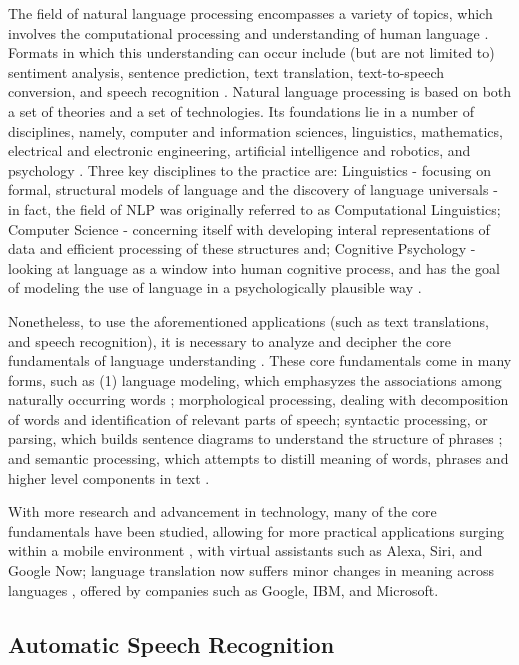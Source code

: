 The field of natural language processing encompasses a variety of topics, which involves the computational processing and understanding of human language \cite{otter2020survey}. Formats in which this understanding can occur include (but are not limited to) sentiment analysis, sentence prediction, text translation, text-to-speech conversion, and speech recognition \cite{chowdhury2003natural}. Natural language processing is based on both a set of theories and a set of technologies. Its foundations lie in a number of disciplines, namely, computer and information sciences, linguistics, mathematics, electrical and electronic engineering, artificial intelligence and robotics, and psychology \cite{chowdhury2003natural}. Three key disciplines to the practice are: Linguistics - focusing on formal, structural models of language and the discovery of language universals - in fact, the field of NLP was originally referred to as Computational Linguistics; Computer Science - concerning itself with developing interal representations of data and efficient processing of these structures and; Cognitive Psychology - looking at language as a window into human cognitive process, and has the goal of modeling the use of language in a psychologically plausible way  \cite{liddy2001natural}.

Nonetheless, to use the aforementioned applications (such as text translations, and speech recognition), it is necessary to analyze and decipher the core fundamentals of language understanding \cite{otter2020survey}. These core fundamentals come in many forms, such as (1) language modeling, which emphasyzes the associations among naturally occurring words \cite{DBLP:journals/corr/cs-CL-0108005}; morphological processing, dealing with decomposition of words and identification of relevant parts of speech; syntactic processing, or parsing, which builds sentence diagrams to understand the structure of phrases \cite{woolf2010building}; and semantic processing, which attempts to distill meaning of words, phrases and higher level components in text \cite{otter2020survey}.

With more research and advancement in technology, many of the core fundamentals have been studied, allowing for more practical applications surging within a mobile environment \cite{yu2016automatic}, with virtual assistants such as Alexa, Siri, and Google Now; language translation now suffers minor changes in meaning across languages \cite{de2018no}, offered by companies such as Google, IBM, and Microsoft.

\subsection{Automatic Speech Recognition}

